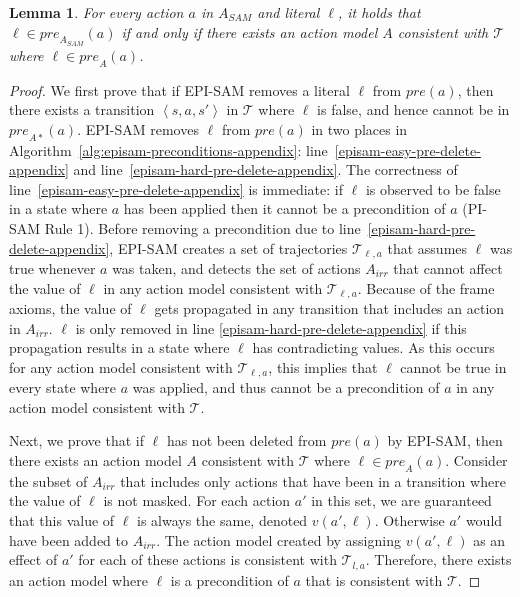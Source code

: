 \documentclass{article}
\theoremstyle{plain}
\newtheorem{lemma}[theorem]{Lemma}
\theoremstyle{definition}
\theoremstyle{remark}
\theoremstyle{observation}
\newcommand{\tuple}[1]{\ensuremath{\left \langle #1 \right \rangle }}
\newcommand{\pre}{\textit{pre}}
\newcommand{\sam}{\textit{SAM}\xspace}
\begin{document}
\begin{lemma}\label{lem:pre-strong-appendix}
For every action $a$ in $A_\sam$ and literal $\ell$, it holds that 
$\ell\in\pre_{A_\sam}(a)$ if and only if there exists an action model $A$ consistent with $\mathcal{T}$ where $\ell\in\pre_A(a)$. 
\end{lemma}
\begin{proof}
We first prove that if EPI-SAM removes a literal $\ell$ from $\pre(a)$, then there exists a transition $\tuple{s,a,s'}$ in $\mathcal{T}$ where $\ell$ is false, and hence cannot be in $\pre_{A*}(a)$. 
EPI-SAM removes $\ell$ from $\pre(a)$ in two places in Algorithm~\ref{alg:episam-preconditions-appendix}: line~\ref{episam-easy-pre-delete-appendix} and line~\ref{episam-hard-pre-delete-appendix}. 
The correctness of line~\ref{episam-easy-pre-delete-appendix} is immediate: if $\ell$ is observed to be false in a state where $a$ has been applied then it cannot be a precondition of $a$ (PI-SAM Rule 1). 
Before removing a precondition due to line~\ref{episam-hard-pre-delete-appendix}, 
EPI-SAM creates a set of trajectories $\mathcal{T}_{\ell,a}$ that assumes $\ell$ was true whenever $a$ was taken, 
and detects the set of actions $A_{irr}$ that cannot affect the value of $\ell$ in any action model consistent with $\mathcal{T}_{\ell,a}$. 
Because of the frame axioms, the value of $\ell$ gets propagated in any transition that includes an action in $A_{irr}$. $\ell$ is only removed in line \ref{episam-hard-pre-delete-appendix} if this propagation results in a state where $\ell$ has contradicting values. As this occurs for any action model consistent with $\mathcal{T}_{\ell,a}$, this implies that $\ell$ cannot be true in every state where $a$ was applied, and thus cannot be a precondition of $a$ in any action model consistent with $\mathcal{T}$. 



Next, we prove that if $\ell$ has not been deleted from $\pre(a)$ by EPI-SAM, then there exists an action model $A$ consistent with $\mathcal{T}$ where $\ell\in\pre_A(a)$. 
Consider the subset of $A_{irr}$ that includes only actions that have been in a transition where the value of $\ell$ is not masked. 
For each action $a'$ in this set, we are guaranteed that this value of $\ell$ is always the same, denoted $v(a',\ell)$. Otherwise $a'$ would have been added to $A_{irr}$. 
The action model created by assigning $v(a',\ell)$ as an effect of $a'$ for each of these actions is consistent with $\mathcal{T}_{l,a}$. 
Therefore, there exists an action model where $\ell$ is a precondition of $a$ that is consistent with $\mathcal{T}$. 
\end{proof}
\end{document}

